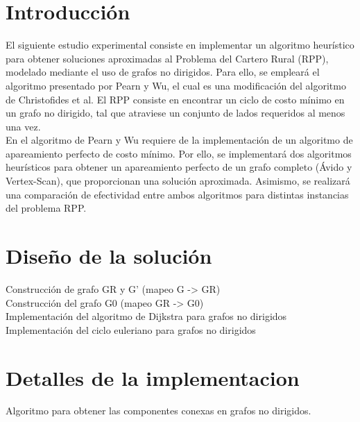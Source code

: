 \documentclass[11pt]{article}
\begin{document}
                                                               
\newpage
                                                    
\section{Introducción}

El siguiente estudio experimental consiste en implementar un algoritmo heurístico para
obtener soluciones aproximadas al Problema del Cartero Rural (RPP), modelado mediante el uso 
de grafos no dirigidos. Para ello, se empleará el algoritmo presentado por Pearn y Wu, el
cual es una modificación del algoritmo de Christofides et al. El RPP consiste en encontrar 
un ciclo de costo mínimo en un grafo no dirigido, tal que atraviese un conjunto de lados 
requeridos al menos una vez. \\

En el algoritmo de Pearn y Wu requiere de la implementación de un algoritmo de apareamiento 
perfecto de costo mínimo. Por ello, se implementará dos algoritmos heurísticos para obtener 
un apareamiento perfecto de un grafo completo (Ávido y Vertex-Scan), que proporcionan una 
solución aproximada. Asimismo, se realizará una comparación de efectividad entre ambos 
algoritmos para distintas instancias del problema RPP. \\

\section{Diseño de la solución}

Construcción de grafo GR y G' (mapeo G -> GR)\\

Construcción del grafo G0 (mapeo GR -> G0) \\

Implementación del algoritmo de Dijkstra para grafos no dirigidos\\

Implementación del ciclo euleriano para grafos no dirigidos\\




\section{Detalles de la implementacion}

Algoritmo para obtener las componentes conexas en grafos no dirigidos. \\
\end{document}
